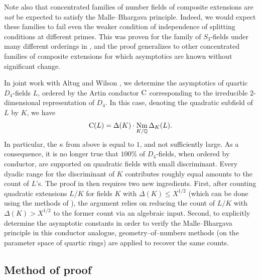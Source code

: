 \documentclass[10pt]{article}
\theoremstyle{plain}
\theoremstyle{definition}
\theoremstyle{remark}
\def\Q{{\mathbb Q}}
\def\Q{{\mathbb Q}}
\DeclareMathOperator{\Nm}{Nm}
\begin{document}
Note also that concentrated families of number fields of composite extensions are {\em not} be expected to satisfy the Malle--Bhargava principle. Indeed, we would expect these families to fail even the weaker condition of independence of splitting conditions at different primes. This was proven for the family of $S_3$-fields under many different orderings in \cite{STCubicInv}, and the proof generalizes to other concentrated families of composite extensions for which asymptotics are known without significant change.



In joint work with Altug and Wilson \cite{D4preprint}, we determine
the asymptotics of quartic $D_4$-fields $L$, ordered by the
Artin conductor ${\rm C}$ corresponding to the irreducible $2$-dimensional
representation of $D_4$. In this case, denoting the quadratic subfield
of $L$ by $K$, we have
\begin{equation*}
{\rm C}(L)=\Delta(K)\cdot \Nm_{K/\Q}\Delta_K(L).
\end{equation*}
In particular, the $\kappa$ from above is equal to $1$, and not
sufficiently large. As a consequence, it is no longer true that
$100\%$ of $D_4$-fields, when ordered by conductor, are
supported on quadratic fields with small discriminant. Every dyadic range for the
discriminant of $K$ contributes roughly equal amounts to the count of
$L$'s. The proof in \cite{D4preprint} then requires two new ingredients. First, after
counting quadratic extensions $L/K$ for fields $K$ with $\Delta(K)\leq
X^{1/2}$ (which can be done using the methods of \cite{MR1918290}), the argument relies on
reducing the count of $L/K$ with $\Delta(K)>X^{1/2}$ to the former count
via an algebraic input. Second, to explicitly determine the
asymptotic constants in order to verify the Malle--Bhargava principle in this conductor analogue, 
geometry--of--numbers methods (on the parameter space of quartic
rings) are applied to recover the same counts.

\subsection{Method of proof}
\end{document}
